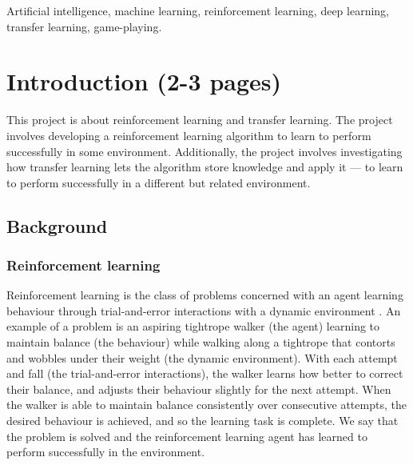 \documentclass[12pt,a4paper]{article}
\begin{document}
\begin{keywords}
Artificial intelligence, machine learning, reinforcement learning, deep learning, transfer learning, game-playing.
\end{keywords}

\newpage
\section{Introduction (2-3 pages)}
This project is about reinforcement learning and transfer learning. The project involves developing a reinforcement learning algorithm to learn to perform successfully in some environment. Additionally, the project involves investigating how transfer learning lets the algorithm store knowledge and apply it --- to learn to perform successfully in a different but related environment.

\subsection{Background} 
\subsubsection{Reinforcement learning}
Reinforcement learning is the class of problems concerned with an agent learning behaviour through trial-and-error interactions with a dynamic environment \cite{Kaelbling1996}. An example of a problem is an aspiring tightrope walker (the agent) learning to maintain balance (the behaviour) while walking along a tightrope that contorts and wobbles under their weight (the dynamic environment). With each attempt and fall (the trial-and-error interactions), the walker learns how better to correct their balance, and adjusts their behaviour slightly for the next attempt. When the walker is able to maintain balance consistently over consecutive attempts, the desired behaviour is achieved, and so the learning task is complete. We say that the problem is solved and the reinforcement learning agent has learned to perform successfully in the environment.  
\end{document}
